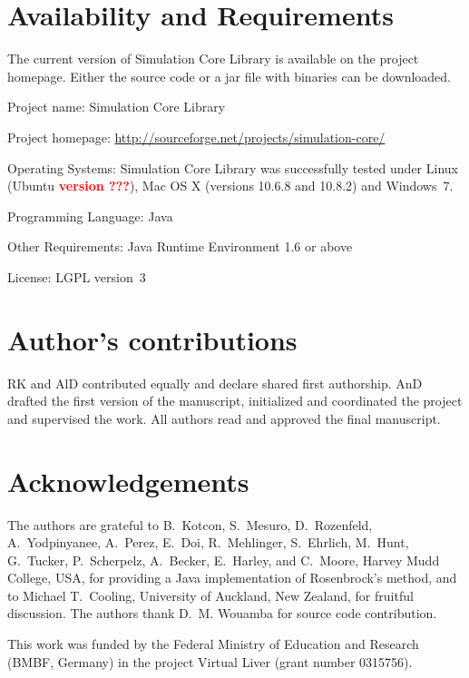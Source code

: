 \documentclass[10pt]{bmc_article}
\newenvironment{bmcformat}{\baselineskip20pt\sloppy\setboolean{publ}{false}}{\baselineskip20pt\sloppy}
\newcommand{\TODO}[1]{\textcolor{red}{\textbf{#1}}}
\begin{document}
\begin{bmcformat}
\section*{Availability and Requirements}
The current version of Simulation Core Library is available on the project homepage. Either the source code or a jar file with binaries can be downloaded.

Project name: Simulation Core Library

Project homepage: \url{http://sourceforge.net/projects/simulation-core/}

Operating Systems: Simulation Core Library was successfully tested under Linux (Ubuntu \TODO{version ???}), Mac OS X (versions 10.6.8 and 10.8.2) and Windows~7.

Programming Language: Java\texttrademark{}

Other Requirements: Java Runtime Environment 1.6 or above

License: LGPL version~3

\bigskip

\section*{Author's contributions}
RK and AlD contributed equally and declare shared first authorship.
AnD drafted the first version of the manuscript, initialized and coordinated the project and supervised the work.
All authors read and approved the final manuscript.
    

\section*{Acknowledgements}
The authors are grateful to B.~Kotcon, S.~Mesuro, D.~Rozenfeld, A.~Yodpinyanee,
A.~Perez, E.~Doi, R.~Mehlinger, S.~Ehrlich, M.~Hunt, G.~Tucker, P.~Scherpelz,
A.~Becker, E.~Harley, and C.~Moore, Harvey Mudd College, USA, for providing a
Java implementation of Rosenbrock's method, and to Michael T.~Cooling,
University of Auckland, New Zealand, for fruitful discussion. The authors thank
D.~M. Wouamba for source code contribution.

This work was funded by the Federal Ministry of Education and Research (BMBF,
Germany) in the project Virtual Liver (grant number 0315756).
 

\end{bmcformat}
\end{document}
